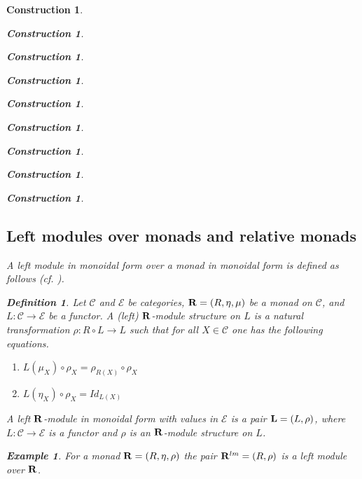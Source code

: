 \documentclass[12pt]{amsart}
\newtheorem{definition}[proposition]{Definition}
\newtheorem{example}[proposition]{Example}
\numberwithin{proposition}{subsection}
\newtheorem{construction}[proposition]{Construction}
\newcommand{\llabel}[1]{\label{#1}}
\newcommand{\sr}{\rightarrow}
\newcommand{\R}{{\bf R}}
\newcommand{\C}{{\mathcal C}}
\newcommand{\E}{{\mathcal E}}
\begin{document}
\begin{construction}
\begin{construction}
\begin{construction}
\begin{construction}
\begin{construction}
\begin{construction}
\begin{construction}
\begin{construction}
\begin{construction}
\subsection{Left modules over monads and relative monads}

%
A left module in monoidal form over a monad in monoidal form is defined as follows (cf.{} \cite[p.~222]{HM2007}). 
%
\begin{definition}
\llabel{2017.04.01.def2} 
Let $\C$ and $\E$ be categories, $\R=(R,\eta,\mu)$ be a
monad on $\C$, and $L:\C\sr \E$ be a functor. A {\em (left) $\R$-module structure} on
$L$ is a natural transformation $\rho:R\circ L\sr L$ such that for all $X\in\C$
one has the following equations.
%
\begin{enumerate}
\item $L(\mu_X)\circ \rho_X=\rho_{R(X)}\circ \rho_X$
\item $L(\eta_X)\circ \rho_X=Id_{L(X)}$
\end{enumerate}
%
A left $\R$-module in monoidal form with values in $\E$ is a pair 
${\bf L}=(L,\rho)$, where $L:\C\sr \E$ is a functor and $\rho$ is an $\R$-module
structure on $L$.
\end{definition}
%
\begin{example}\llabel{2017.04.15.ex1}\rm
For a monad $\R=(R,\eta,\rho)$ the pair $\R^{lm}=(R,\rho)$ is a left module over $\R$.
\end{example}
%


\end{construction}
\end{construction}
\end{construction}
\end{construction}
\end{construction}
\end{construction}
\end{construction}
\end{construction}
\end{construction}
\end{document}
